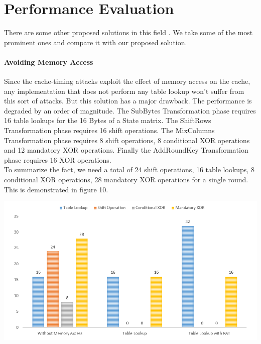 \documentclass[3p]{elsarticle}
\begin{document}
\section{Performance Evaluation}

There are some other proposed solutions in this field \citep{osvik,paladi,rudra2001efficient,matsui2006far,matsui2007power,konighofer2008fast,meushaw2005device}. We take some of the most prominent ones and compare it with our proposed solution.\\

\paragraph{Avoiding Memory Access}
Since the cache-timing attacks exploit the effect of memory access on the cache, any implementation that does not perform any table lookup won't suffer from this sort of attacks. But this solution has a major drawback. The performance is degraded by an order of magnitude. The SubBytes Transformation phase requires 16 table lookups for the 16 Bytes of a State matrix. The ShiftRows Transformation phase requires 16 shift operations. The MixColumns Transformation phase requires 8 shift operations, 8 conditional XOR operations and 12 mandatory XOR operations. Finally the AddRoundKey Transformation phase requires 16 XOR operations.\\

To summarize the fact, we need a total of 24 shift operations, 16 table lookups, 8 conditional XOR operations, 28 mandatory XOR operations for a single round. This is demonstrated in figure 10.

\begin{center}
\includegraphics[scale=0.4,natwidth=902,natheight=493]{Figures/withnormal(new).png}
\label{fig: Comparison of RAT with Straightforward AES Implementation.}
\end{center}
\end{document}
